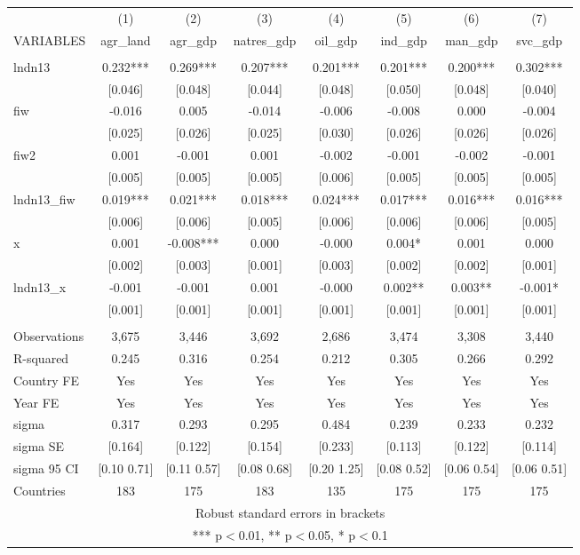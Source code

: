 \begin{tabular}{lccccccc} \hline
 & (1) & (2) & (3) & (4) & (5) & (6) & (7) \\
VARIABLES & agr\_land & agr\_gdp & natres\_gdp & oil\_gdp & ind\_gdp & man\_gdp & svc\_gdp \\ \hline
 &  &  &  &  &  &  &  \\
lndn13 & 0.232*** & 0.269*** & 0.207*** & 0.201*** & 0.201*** & 0.200*** & 0.302*** \\
 & [0.046] & [0.048] & [0.044] & [0.048] & [0.050] & [0.048] & [0.040] \\
fiw & -0.016 & 0.005 & -0.014 & -0.006 & -0.008 & 0.000 & -0.004 \\
 & [0.025] & [0.026] & [0.025] & [0.030] & [0.026] & [0.026] & [0.026] \\
fiw2 & 0.001 & -0.001 & 0.001 & -0.002 & -0.001 & -0.002 & -0.001 \\
 & [0.005] & [0.005] & [0.005] & [0.006] & [0.005] & [0.005] & [0.005] \\
lndn13\_fiw & 0.019*** & 0.021*** & 0.018*** & 0.024*** & 0.017*** & 0.016*** & 0.016*** \\
 & [0.006] & [0.006] & [0.005] & [0.006] & [0.006] & [0.006] & [0.005] \\
x & 0.001 & -0.008*** & 0.000 & -0.000 & 0.004* & 0.001 & 0.000 \\
 & [0.002] & [0.003] & [0.001] & [0.003] & [0.002] & [0.002] & [0.001] \\
lndn13\_x & -0.001 & -0.001 & 0.001 & -0.000 & 0.002** & 0.003** & -0.001* \\
 & [0.001] & [0.001] & [0.001] & [0.001] & [0.001] & [0.001] & [0.001] \\
 &  &  &  &  &  &  &  \\
Observations & 3,675 & 3,446 & 3,692 & 2,686 & 3,474 & 3,308 & 3,440 \\
R-squared & 0.245 & 0.316 & 0.254 & 0.212 & 0.305 & 0.266 & 0.292 \\
Country FE & Yes & Yes & Yes & Yes & Yes & Yes & Yes \\
Year FE & Yes & Yes & Yes & Yes & Yes & Yes & Yes \\
sigma & 0.317 & 0.293 & 0.295 & 0.484 & 0.239 & 0.233 & 0.232 \\
sigma SE & [0.164] & [0.122] & [0.154] & [0.233] & [0.113] & [0.122] & [0.114] \\
sigma 95 CI & [0.10 0.71] & [0.11 0.57] & [0.08 0.68] & [0.20 1.25] & [0.08 0.52] & [0.06 0.54] & [0.06 0.51] \\
 Countries & 183 & 175 & 183 & 135 & 175 & 175 & 175 \\ \hline
\multicolumn{8}{c}{ Robust standard errors in brackets} \\
\multicolumn{8}{c}{ *** p$<$0.01, ** p$<$0.05, * p$<$0.1} \\
\end{tabular}
